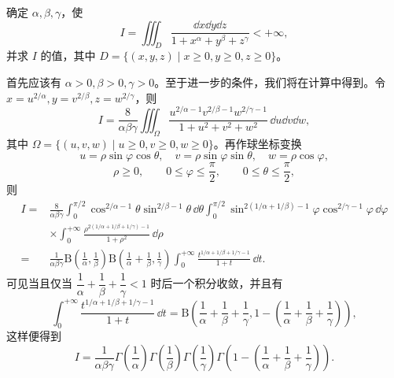 \begin{xexample}[23.3.2]
确定 $\alpha,\beta,\gamma$，使
\[
  I=\iiint_D\frac{\dd x\dd y\dd z}{1+x^\alpha+y^\beta+z^\gamma}<+\infty,
\]
并求 $I$ 的值，其中 $D=\{(x,y,z)\mid x\geqslant0,y\geqslant0,z\geqslant0\}$。
\end{xexample}
\begin{xsolution}
首先应该有 $\alpha>0,\beta>0,\gamma>0$。至于进一步的条件，我们将在计算中得到。令 $x=u^{2/\alpha},y=v^{2/\beta},z=w^{2/\gamma}$，则
\[
  I=\frac8{\alpha\beta\gamma}\iiint_\Omega\frac{u^{2/\alpha-1}v^{2/\beta-1}w^{2/\gamma-1}}{1+u^2+v^2+w^2}\,\dd u\dd v\dd w,
\]
其中 $\Omega=\{(u,v,w)\mid u\geqslant0,v\geqslant0,w\geqslant0\}$。再作球坐标变换
\[
  u=\rho\sin\varphi\cos\theta,\quad v=\rho\sin\varphi\sin\theta,\quad w=\rho\cos\varphi,
\]
\[
  \rho\geqslant0,\qquad0\leqslant\varphi\leqslant\frac\pi2,\qquad0\leqslant\theta\leqslant\frac\pi2,
\]
则
\[
\begin{aligned}
I={}&\frac8{\alpha\beta\gamma}\int_0^{\pi/2}\cos^{2/\alpha-1}\theta\sin^{2/\beta-1}\theta\,\dd\theta
\int_0^{\pi/2}\sin^{2(1/\alpha+1/\beta)-1}\varphi\cos^{2/\gamma-1}\varphi\,\dd\varphi\\
&\times\int_0^{+\infty}\frac{\rho^{2(1/\alpha+1/\beta+1/\gamma)-1}}{1+\rho^2}\,\dd\rho\\
={}&\frac1{\alpha\beta\gamma}\mathrm{B}\left(\frac1\alpha,\frac1\beta\right)
\mathrm{B}\left(\frac1\alpha+\frac1\beta,\frac1\gamma\right)
\int_0^{+\infty}\frac{t^{1/\alpha+1/\beta+1/\gamma-1}}{1+t}\,\dd t.
\end{aligned}
\]
可见当且仅当 $\dfrac1\alpha+\dfrac1\beta+\dfrac1\gamma<1$ 时后一个积分收敛，并且有
\[
  \int_0^{+\infty}\frac{t^{1/\alpha+1/\beta+1/\gamma-1}}{1+t}\,\dd t
  =\mathrm{B}\left(\frac1\alpha+\frac1\beta+\frac1\gamma,1-\left(\frac1\alpha+\frac1\beta+\frac1\gamma\right)\right),
\]
这样便得到
\[
  I=\frac1{\alpha\beta\gamma}\Gamma\left(\frac1\alpha\right)\Gamma\left(\frac1\beta\right)\Gamma\left(\frac1\gamma\right)
  \Gamma\left(1-\left(\frac1\alpha+\frac1\beta+\frac1\gamma\right)\right).
\]
\end{xsolution}


